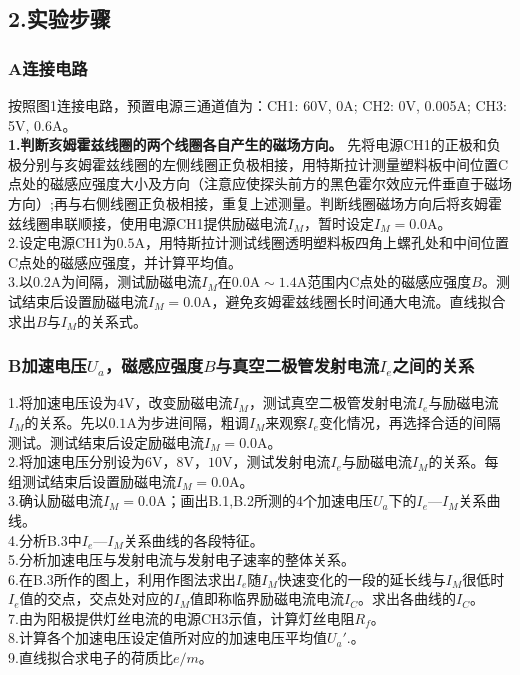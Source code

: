 \documentclass{ctexart}
\begin{document}
\subsection*{2.\quad 实验步骤}
\clearpage
\subsubsection*{A\quad 连接电路}
\noindent 按照图1连接电路，预置电源三通道值为：CH1: 60V, 0A; CH2: 0V, 0.005A; CH3: 5V, 0.6A。\\
\noindent \textbf{1.判断亥姆霍兹线圈的两个线圈各自产生的磁场方向。}   先将电源CH1的正极和负极分别与亥姆霍兹线圈的左侧线圈正负极相接，用特斯拉计测量塑料板中间位置C点处的磁感应强度大小及方向（注意应使探头前方的黑色霍尔效应元件垂直于磁场方向）;再与右侧线圈正负极相接，重复上述测量。判断线圈磁场方向后将亥姆霍兹线圈串联顺接，使用电源CH1提供励磁电流$I_M$，暂时设定$I_M=0.0\mathrm{A}$。\\
\noindent 2.设定电源CH1为$0.5\mathrm{A}$，用特斯拉计测试线圈透明塑料板四角上螺孔处和中间位置C点处的磁感应强度，并计算平均值。\\
\noindent 3.以$0.2\mathrm{A}$为间隔，测试励磁电流$I_M$在$0.0\mathrm{A}\sim 1.4\mathrm{A}$范围内C点处的磁感应强度$B$。测试结束后设置励磁电流$I_M=0.0\mathrm{A}$，避免亥姆霍兹线圈长时间通大电流。直线拟合求出$B$与$I_M$的关系式。
\subsubsection*{B\quad 加速电压$U_a$，磁感应强度$B$与真空二极管发射电流$I_e$之间的关系}
\noindent 1.将加速电压设为$4\mathrm{V}$，改变励磁电流$I_M$，测试真空二极管发射电流$I_e$与励磁电流$I_M$的关系。先以$0.1\mathrm{A}$为步进间隔，粗调$I_M$来观察$I_e$变化情况，再选择合适的间隔测试。测试结束后设定励磁电流$I_M=0.0\mathrm{A}$。\\
\noindent 2.将加速电压分别设为$6\mathrm{V}$，$8\mathrm{V}$，$10\mathrm{V}$，测试发射电流$I_e$与励磁电流$I_M$的关系。每组测试结束后设置励磁电流$I_M=0.0\mathrm{A}$。\\
\noindent 3.确认励磁电流$I_M=0.0\mathrm{A}$；画出B.1,B.2所测的4个加速电压$U_a$下的$I_e—I_M$关系曲线。\\
\noindent 4.分析B.3中$I_e—I_M$关系曲线的各段特征。\\
\noindent 5.分析加速电压与发射电流与发射电子速率的整体关系。\\
\noindent 6.在B.3所作的图上，利用作图法求出$I_e$随$I_M$快速变化的一段的延长线与$I_M$很低时$I_e$值的交点，交点处对应的$I_M$值即称临界励磁电流电流$I_{C}$。求出各曲线的$I_C$。\\
\noindent 7.由为阳极提供灯丝电流的电源CH3示值，计算灯丝电阻$R_f$。\\
\noindent 8.计算各个加速电压设定值所对应的加速电压平均值$U_a'$.。\\
\noindent 9.直线拟合求电子的荷质比${e}/{m}$。
\end{document}
